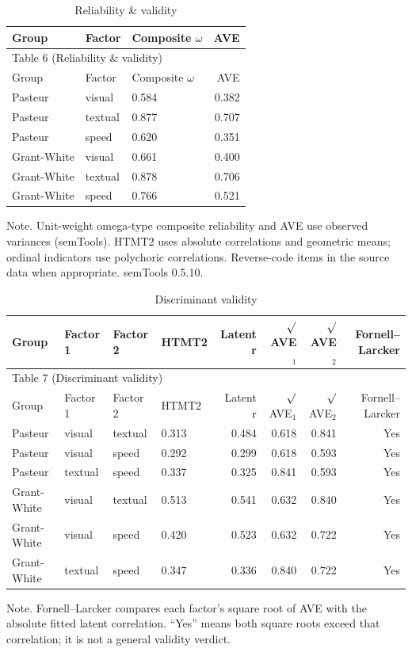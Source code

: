 \documentclass[11pt]{article}
\begin{document}
\small
\begin{longtable}{lllr}
\caption{Reliability \& validity}\\
\toprule
Group & Factor & Composite $\omega$ & AVE \\
\midrule
\endfirsthead
\multicolumn{4}{l}{Table 6 (Reliability \& validity)} \\
\toprule
Group & Factor & Composite $\omega$ & AVE \\
\midrule
\endhead
Pasteur & visual & 0.584 & 0.382 \\
Pasteur & textual & 0.877 & 0.707 \\
Pasteur & speed & 0.620 & 0.351 \\
Grant-White & visual & 0.661 & 0.400 \\
Grant-White & textual & 0.878 & 0.706 \\
Grant-White & speed & 0.766 & 0.521 \\
\bottomrule
\end{longtable}
\noindent Note. Unit-weight omega-type composite reliability and AVE use observed variances (semTools). HTMT2 uses absolute correlations and geometric means; ordinal indicators use polychoric correlations. Reverse-code items in the source data when appropriate. semTools 0.5.10.\par

\begin{landscape}
\small
\begin{longtable}{llllrrrr}
\caption{Discriminant validity}\\
\toprule
Group & Factor 1 & Factor 2 & HTMT2 & Latent r & $\surd$AVE$_{1}$ & $\surd$AVE$_{2}$ & Fornell–Larcker \\
\midrule
\endfirsthead
\multicolumn{8}{l}{Table 7 (Discriminant validity)} \\
\toprule
Group & Factor 1 & Factor 2 & HTMT2 & Latent r & $\surd$AVE$_{1}$ & $\surd$AVE$_{2}$ & Fornell–Larcker \\
\midrule
\endhead
Pasteur & visual & textual & 0.313 & 0.484 & 0.618 & 0.841 & Yes \\
Pasteur & visual & speed & 0.292 & 0.299 & 0.618 & 0.593 & Yes \\
Pasteur & textual & speed & 0.337 & 0.325 & 0.841 & 0.593 & Yes \\
Grant-White & visual & textual & 0.513 & 0.541 & 0.632 & 0.840 & Yes \\
Grant-White & visual & speed & 0.420 & 0.523 & 0.632 & 0.722 & Yes \\
Grant-White & textual & speed & 0.347 & 0.336 & 0.840 & 0.722 & Yes \\
\bottomrule
\end{longtable}
\noindent Note. Fornell–Larcker compares each factor's square root of AVE with the absolute fitted latent correlation. “Yes” means both square roots exceed that correlation; it is not a general validity verdict.\par
\end{landscape}
\end{document}
